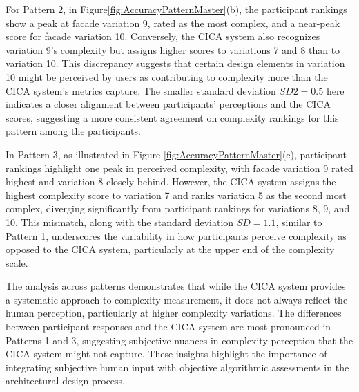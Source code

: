 For Pattern 2, in Figure\ref{fig:AccuracyPatternMaster}(b), the participant rankings show a peak at facade variation 9, rated as the most complex, and a near-peak score for facade variation 10.
Conversely, the CICA system also recognizes variation 9's complexity but assigns higher scores to variations 7 and 8 than to variation 10.
This discrepancy suggests that certain design elements in variation 10 might be perceived by users as contributing to complexity more than the CICA system's metrics capture.
The smaller standard deviation \(SD2 = 0.5\) here indicates a closer alignment between participants’ perceptions and the CICA scores, suggesting a more consistent agreement on complexity rankings for this pattern among the participants.

In Pattern 3, as illustrated in Figure \ref{fig:AccuracyPatternMaster}(c), participant rankings highlight one peak in perceived complexity, with facade variation 9 rated highest and variation 8 closely behind.
However, the CICA system assigns the highest complexity score to variation 7 and ranks variation 5 as the second most complex, diverging significantly from participant rankings for variations 8, 9, and 10.
This mismatch, along with the standard deviation \(SD = 1.1\), similar to Pattern 1, underscores the variability in how participants perceive complexity as opposed to the CICA system, particularly at the upper end of the complexity scale.

The analysis across patterns demonstrates that while the CICA system provides a systematic approach to complexity measurement, it does not always reflect the human perception, particularly at higher complexity variations.
The differences between participant responses and the CICA system are most pronounced in Patterns 1 and 3, suggesting subjective nuances in complexity perception that the CICA system might not capture.
These insights highlight the importance of integrating subjective human input with objective algorithmic assessments in the architectural design process.



